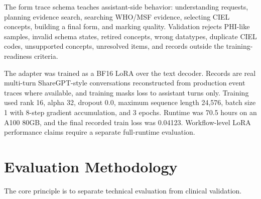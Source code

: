 \documentclass[11pt]{article}
\newcommand{\CIEL}{CIEL}
\newcommand{\WHO}{WHO/MSF}
\begin{document}
The form trace schema teaches assistant-side behavior: understanding requests, planning evidence search, searching \WHO{} evidence, selecting \CIEL{} concepts, building a final form, and marking quality. Validation rejects PHI-like samples, invalid schema states, retired concepts, wrong datatypes, duplicate CIEL codes, unsupported concepts, unresolved items, and records outside the training-readiness criteria.

The adapter was trained as a BF16 LoRA over the text decoder. Records are real multi-turn ShareGPT-style conversations reconstructed from production event traces where available, and training masks loss to assistant turns only. Training used rank 16, alpha 32, dropout 0.0, maximum sequence length 24,576, batch size 1 with 8-step gradient accumulation, and 3 epochs. Runtime was 70.5 hours on an A100 80GB, and the final recorded train loss was 0.04123. Workflow-level LoRA performance claims require a separate full-runtime evaluation.

\section{Evaluation Methodology}

The core principle is to separate technical evaluation from clinical validation.
\end{document}
